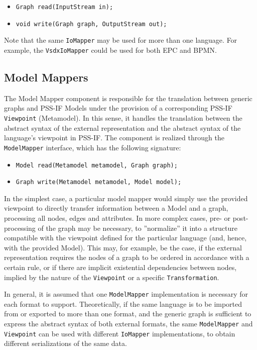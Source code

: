\begin{itemize}
\item \texttt{Graph read(InputStream in);}
\item \texttt{void write(Graph graph, OutputStream out);}
\end{itemize}

Note that the same \texttt{IoMapper} may be used for more than one language. For example, the \texttt{VsdxIoMapper} could be used for both EPC and BPMN.

\subsection{Model Mappers}
\label{sec:impl:comp:model}

The Model Mapper component is responsible for the translation between generic graphs and PSS-IF Models under the provision of a corresponding PSS-IF \texttt{Viewpoint} (Metamodel). In this sense, it handles the translation between the abstract syntax of the external representation and the abstract syntax of the language's viewpoint in PSS-IF. The component is realized through the \texttt{ModelMapper} interface, which has the following signature:

\begin{itemize}
\item \texttt{Model read(Metamodel metamodel, Graph graph);}
\item \texttt{Graph write(Metamodel metamodel, Model model);}
\end{itemize}

In the simplest case, a particular model mapper would simply use the provided viewpoint to directly transfer information between a Model and a graph, processing all nodes, edges and attributes. In more complex cases, pre- or post-processing of the graph may be necessary, to ''normalize'' it into a structure compatible with the viewpoint defined for the particular language (and, hence, with the provided Model). This may, for example, be the case, if the external representation requires the nodes of a graph to be ordered in accordance with a certain rule, or if there are implicit existential dependencies between nodes, implied by the nature of the \texttt{Viewpoint} or a specific \texttt{Transformation}.

In general, it is assumed that one \texttt{ModelMapper} implementation is necessary for each format to support. Theoretically, if the same language is to be imported from or exported to more than one format, and the generic graph is sufficient to express the abstract syntax of both external formats, the same \texttt{ModelMapper} and \texttt{Viewpoint} can be used with different \texttt{IoMapper} implementations, to obtain different serializations of the same data.

